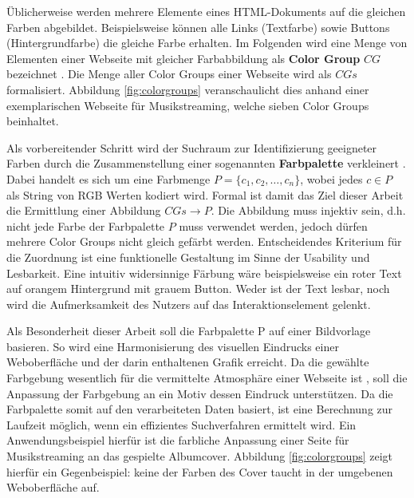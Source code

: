 \documentclass[10pt,a4paper,bibliography=totoc,twocolumn]{scrartcl}
\begin{document}
Üblicherweise werden mehrere Elemente eines HTML-Dokuments auf die gleichen Farben abgebildet. Beispielsweise können alle Links (Textfarbe) sowie Buttons (Hintergrundfarbe) die gleiche Farbe erhalten. Im Folgenden wird eine Menge von Elementen einer Webseite mit gleicher Farbabbildung als \textbf{Color Group} $CG$ bezeichnet \citep[siehe auch][]{webpage, patterns}. Die Menge aller Color Groups einer Webseite wird als $CGs$ formalisiert. Abbildung \ref{fig:colorgroups} veranschaulicht dies anhand einer exemplarischen Webseite für Musikstreaming, welche sieben Color Groups beinhaltet.

Als vorbereitender Schritt wird der Suchraum zur Identifizierung geeigneter Farben durch die Zusammenstellung einer sogenannten \textbf{Farbpalette} verkleinert \citep{webpage}. Dabei handelt es sich um eine Farbmenge $P = \{c_1, c_2, \ldots, c_n\}$, wobei jedes $c \in P$ als String von RGB Werten kodiert wird. Formal ist damit das Ziel dieser Arbeit die Ermittlung einer Abbildung $CGs \to P$. Die Abbildung muss injektiv sein, d.h. nicht jede Farbe der Farbpalette $P$ muss verwendet werden, jedoch dürfen mehrere Color Groups nicht gleich gefärbt werden. Entscheidendes Kriterium für die Zuordnung ist eine funktionelle Gestaltung im Sinne der Usability und Lesbarkeit. Eine intuitiv widersinnige Färbung wäre beispielsweise ein roter Text auf orangem Hintergrund mit grauem Button. Weder ist der Text lesbar, noch wird die Aufmerksamkeit des Nutzers auf das Interaktionselement gelenkt.

Als Besonderheit dieser Arbeit soll die Farbpalette P auf einer Bildvorlage basieren. So wird eine Harmonisierung des visuellen Eindrucks einer Weboberfläche und der darin enthaltenen Grafik erreicht. Da die gewählte Farbgebung wesentlich für die vermittelte Atmosphäre einer Webseite ist \citep{webdesign}, soll die Anpassung der Farbgebung an ein Motiv dessen Eindruck unterstützen. Da die Farbpalette somit auf den verarbeiteten Daten basiert, ist eine Berechnung zur Laufzeit möglich, wenn ein effizientes Suchverfahren ermittelt wird. Ein Anwendungsbeispiel hierfür ist die farbliche Anpassung einer Seite für Musikstreaming an das gespielte Albumcover. Abbildung \ref{fig:colorgroups} zeigt hierfür ein Gegenbeispiel: keine der Farben des Cover taucht in der umgebenen Weboberfläche auf.
\end{document}
